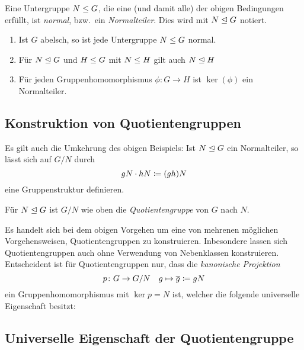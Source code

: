 \begin{definition}
  Eine Untergruppe $N \mathrel{\leq} G$, die eine \textup(und damit alle\textup) der obigen Bedingungen erfüllt, ist \emph{normal}, bzw.\ ein \emph{Normalteiler}.
  Dies wird mit $N \mathrel{\trianglelefteq} G$ notiert.
\end{definition}

\begin{example}
  \begin{enumerate}
    \item
      Ist $G$ abelsch, so ist jede Untergruppe $N \mathrel{\leq} G$ normal.
    \item
      Für $N \mathrel{\trianglelefteq} G$ und $H \mathrel{\leq} G$ mit $N \mathrel{\leq} H$ gilt auch $N \mathrel{\trianglelefteq} H$
    \item
      Für jeden Gruppenhomomorphismus $\phi \colon G \to H$ ist $\ker(\phi)$ ein Normalteiler.
  \end{enumerate}
\end{example}



\subsection{Konstruktion von Quotientengruppen}

Es gilt auch die Umkehrung des obigen Beispiels:
Ist $N \mathrel{\trianglelefteq} G$ ein Normalteiler, so lässt sich auf $G/N$ durch
\[
            gN
  \cdot     hN
  \coloneqq  (gh)N
\]
eine Gruppenstruktur definieren.

\begin{definition}
  Für $N \mathrel{\trianglelefteq} G$ ist $G/N$ wie oben die \emph{Quotientengruppe} von $G$ nach $N$.
\end{definition}

\begin{remark}
  Es handelt sich bei dem obigen Vorgehen um eine von mehrenen möglichen Vorgehensweisen, Quotientengruppen zu konstruieren.
  Inbesondere lassen sich Quotientengruppen auch ohne Verwendung von Nebenklassen konstruieren.
  Entscheident ist für Quotientengruppen nur, dass die \emph{kanonische Projektion}
  \[
              p
    \colon    G
    \to       G/N
    \quad     g
    \mapsto   \overline{g}
    \coloneqq  gN
  \]
  ein Gruppenhomomorphismus mit $\ker p = N$ ist, welcher die folgende universelle Eigenschaft besitzt:
\end{remark}



\subsection{Universelle Eigenschaft der Quotientengruppe}

